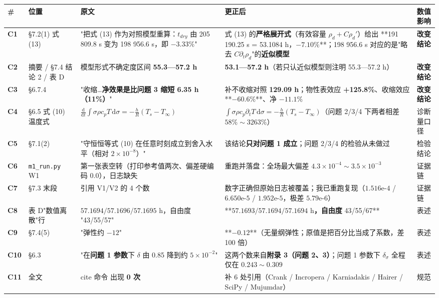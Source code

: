 \begin{center}
\small
\begin{tabular}{lllll}
\toprule
\# & 位置 & 原文 & 更正后 & 数值影响 \\
\midrule
\textbf{C1} & §7.2(1) 式 (13) & "把式 (13) 作为对照模型重算：$t_{dry}$ 由 205 809.8 s 变为 198 956.6 s，即 $-3.33\%$" & 式 (13) 的\textbf{严格展开式}（有效容量 $\rho_d+C\rho_d'$）给出 **191 190.25 s = 53.1084 h，$-7.10\%$**；198 956.6 s 对应的是"略去 $C\partial_t\rho_d$"的\textbf{近似模型} & \textbf{改变结论} \\
\textbf{C2} & 摘要 / §7.4 结论 2 / 表 D & 模型形式不确定度区间 \textbf{55.3—57.2 h} & \textbf{53.1—57.2 h}（若只认近似模型则注明 55.3—57.2 h） & \textbf{改变结论} \\
\textbf{C3} & §6.7.4 & "收缩…\textbf{净效果是比问题 3 缩短 6.35 h（11\%）}" & 补不收缩对照 \textbf{129.09 h}；物性表效应 \textbf{+125.8\%}、收缩效应 **$-60.6\%$**、净 $-11.1\%$ & \textbf{改变结论} \\
\textbf{C4} & §6.5 式 (10) 温度式 & $\frac{\mathrm d}{\mathrm dt}\int\sigma\rho c_pT\,\mathrm d\sigma=-\frac hR(T_s-T_\infty)$ & $\int\sigma\rho c_p\partial_tT\,\mathrm d\sigma=-\frac hR(T_s-T_\infty)$（问题 2/3/4 下两者相差 $58\%\sim3263\%$） & 诊断量口径 \\
\textbf{C5} & §7.1(2) & "守恒恒等式 (10) 在任意时刻成立到舍入水平（相对 $2\times10^{-8}$）" & 该结论\textbf{只对问题 1 成立}；问题 2/3/4 的检验从未做过 & 检验结论 \\
\textbf{C6} & \texttt{m1\_run.py} W1 & 第一张表空转（打印参考值两次、偏差硬编码 0.0），日志缺失 & 重跑并落盘：全场最大偏差 $4.3\times10^{-4}\sim3.5\times10^{-3}$ & 证据链 \\
\textbf{C7} & §7.3 末段 & 引用 V1/V2 的 4 个数 & 数字正确但原始日志被覆盖；我已重跑复现（$1.516\text{e-}4$ / $6.650\text{e-}5$ / $1.952\text{e-}5$，极差 $5.79\text{e-}6$） & 证据链 \\
\textbf{C8} & 表 D"数值离散"行 & $57.1694/57.1696/57.1695$ h，自由度 "43/55/57" & **$57.1693/57.1694/57.1694$ h\textbf{，自由度 }43/55/67** & 表述 \\
\textbf{C9} & §7.4(5) & "弹性约 $-12$" & **$-0.12$**（无量纲弹性；原值是把百分比当成了系数，差 100 倍） & 表述 \\
\textbf{C10} & §6.3 & "在\textbf{问题 1 参数}下 $\delta$ 由 0.85 降到约 $5\times10^{-2}$" & 这两个数来自\textbf{附录 3（问题 2、3）}；问题 1 参数下 $\delta_\sigma$ 全程仅在 $0.243\sim0.309$ & 表述 \\
\textbf{C11} & 全文 & cite 命令 出现 \textbf{0 次} & 补 6 处引用（Crank / Incropera / Karniadakis / Hairer / SciPy / Mujumdar） & 规范 \\
\bottomrule
\end{tabular}
\end{center}


